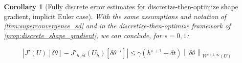 \documentclass[english,a4paper,9pt,oneside]{scrbook}	%
\theoremstyle{break}
\newtheorem{cor}[equation]{Corollary}
\theoremstyle{remark}
\newcommand{\norm}[1]{\left\lVert#1\right\rVert}
\newcommand{\te}{\theta}
\newcommand{\tred}[1]{\textcolor{red}{#1}}
\newcommand{\dive}{\text{div}}
\begin{document}

%

\begin{cor}[Fully discrete error estimates for discretize-then-optimize shape gradient, implicit Euler case]
\label{cor:superconvergence_sd_fd_IE}
With the same assumptions and notation of \cref{thm:superconvergence_sd} and in the discretize-then-optimize framework of \cref{prop:discrete_shape_gradient}, we can conclude, for $s=0,1$:

\begin{align*}
	\left |J'(U)[\delta \te] - J'_{h,\delta t}(U_h)[\delta \te^{-l}] \right|\leq \gamma  (h^{s+1} + \delta t)\norm{\delta \te}_{W^{{s+1},\infty}(U)}
\end{align*}
\end{cor}
\end{document}
